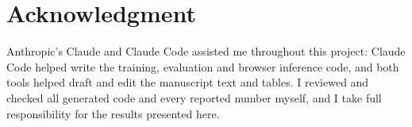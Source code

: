 \section*{Acknowledgment}

Anthropic's Claude and Claude Code assisted me throughout this project: Claude Code helped
write the training, evaluation and browser inference code, and both tools helped draft and edit
the manuscript text and tables. I reviewed and checked all generated code and every reported
number myself, and I take full responsibility for the results presented here.

